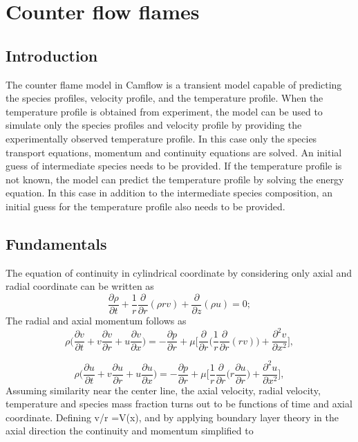 \newpage
\chapter{Counter flow flames}
\section{Introduction}
The counter flame model in Camflow is a transient model capable of predicting the species profiles, velocity profile, and the temperature profile.  When the temperature profile is obtained from experiment, the model can be used to simulate only the species profiles and velocity profile by providing the experimentally observed temperature profile. In this case only the species transport equations,  momentum and continuity equations are solved. An initial guess of intermediate species needs to be provided. If the temperature profile is not known, the model can predict the temperature profile by solving the energy equation. In this case in addition to the intermediate species composition, an initial guess for the temperature profile also needs to be provided. 

\section{Fundamentals}
The equation of continuity in cylindrical coordinate by considering only axial and radial coordinate can be written as
\begin{equation}
 \frac{\partial \rho}{\partial t} + \frac{1}{r}\frac{\partial}{\partial r}(\rho rv) + \frac{\partial}{\partial z}(\rho u) = 0;
\end{equation}
The radial and axial momentum follows as
\begin{equation}
 \rho \bigg( 
 \frac{\partial v}{\partial t} +
 v\frac{\partial v}{\partial r}+
 u\frac{\partial v}{\partial x} \bigg) = -\frac{\partial p}{\partial r} +
\mu \bigg[\frac{\partial}{\partial r}\bigg(\frac{1}{r}\frac{\partial}{\partial r}(rv)\bigg) + \frac{\partial^2v}{\partial x^2}\bigg],
\end{equation}

\begin{equation}
 \rho \bigg( 
 \frac{\partial u}{\partial t} +
 v\frac{\partial u}{\partial r}+
 u\frac{\partial u}{\partial x} \bigg) = -\frac{\partial p}{\partial r} +
\mu \bigg[\frac{1}{r} \frac{\partial}{\partial r}\bigg(r\frac{\partial u}{\partial r}\bigg) + \frac{\partial^2u}{\partial x^2}\bigg],
\end{equation}
Assuming similarity near the center line, the axial velocity, radial velocity, temperature and species mass fraction turns out to be functions of time and axial coordinate. Defining v/r =V(x), and by applying boundary layer theory in the axial direction the continuity and momentum simplified to

